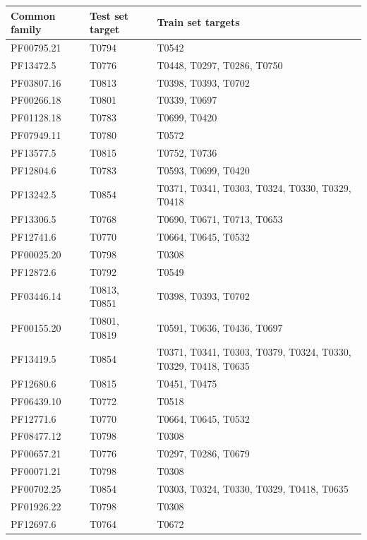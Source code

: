 \documentclass[a4paper,10pt]{article}
\begin{document}
\begin{table}[H]
\begin{center}
\begin{tabular}{ l | l | l }

    Common family & Test set target & Train set targets \\
    \hline
    PF00795.21 & T0794 & T0542 \\ \hline
    PF13472.5 & T0776 & T0448, T0297, T0286, T0750 \\ \hline
    PF03807.16 & T0813 & T0398, T0393, T0702 \\ \hline
    PF00266.18 & T0801 & T0339, T0697 \\ \hline
    PF01128.18 & T0783 & T0699, T0420 \\ \hline
    PF07949.11 & T0780 & T0572 \\ \hline
    PF13577.5 & T0815 & T0752, T0736 \\ \hline
    PF12804.6 & T0783 & T0593, T0699, T0420 \\ \hline
    PF13242.5 & T0854 & T0371, T0341, T0303, T0324, T0330, T0329, T0418 \\ \hline
    PF13306.5 & T0768 & T0690, T0671, T0713, T0653 \\ \hline
    PF12741.6 & T0770 & T0664, T0645, T0532 \\ \hline
    PF00025.20 & T0798 & T0308 \\ \hline
    PF12872.6 & T0792 & T0549 \\ \hline
    PF03446.14 & T0813, T0851 & T0398, T0393, T0702 \\ \hline
    PF00155.20 & T0801, T0819 & T0591, T0636, T0436, T0697 \\ \hline
    PF13419.5 & T0854 & T0371, T0341, T0303, T0379, T0324, T0330, T0329, T0418, T0635 \\ \hline
    PF12680.6 & T0815 & T0451, T0475 \\ \hline
    PF06439.10 & T0772 & T0518 \\ \hline
    PF12771.6 & T0770 & T0664, T0645, T0532 \\ \hline
    PF08477.12 & T0798 & T0308 \\ \hline
    PF00657.21 & T0776 & T0297, T0286, T0679 \\ \hline
    PF00071.21 & T0798 & T0308 \\ \hline
    PF00702.25 & T0854 & T0303, T0324, T0330, T0329, T0418, T0635 \\ \hline
    PF01926.22 & T0798 & T0308 \\ \hline
    PF12697.6 & T0764 & T0672 \\ \hline



\end{tabular}
\end{center}
\end{table}
\end{document}
